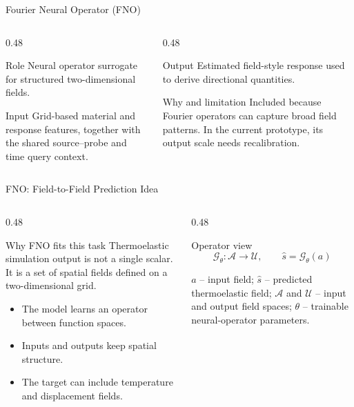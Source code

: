 \documentclass[aspectratio=169,10pt]{beamer}
\begin{document}
\begin{frame}{Fourier Neural Operator (FNO)}
  \begin{columns}[T]
    \begin{column}{0.48\textwidth}
      \begin{block}{Role}
        Neural operator surrogate for structured two-dimensional fields.
      \end{block}
      \begin{block}{Input}
        \footnotesize
        Grid-based material and response features, together with the shared
        source--probe and time query context.
      \end{block}
    \end{column}
    \begin{column}{0.48\textwidth}
      \begin{block}{Output}
        \footnotesize
        Estimated field-style response used to derive directional quantities.
      \end{block}
      \begin{block}{Why and limitation}
        \footnotesize
        Included because Fourier operators can capture broad field patterns.
        In the current prototype, its output scale needs recalibration.
      \end{block}
    \end{column}
  \end{columns}
\end{frame}

\begin{frame}{FNO: Field-to-Field Prediction Idea}
  \begin{columns}[T]
    \begin{column}{0.48\textwidth}
      \begin{block}{Why FNO fits this task}
        \footnotesize
        Thermoelastic simulation output is not a single scalar. It is a set
        of spatial fields defined on a two-dimensional grid.
      \end{block}
      \begin{itemize}
        \footnotesize
        \item The model learns an operator between function spaces.
        \item Inputs and outputs keep spatial structure.
        \item The target can include temperature and displacement fields.
      \end{itemize}
    \end{column}
    \begin{column}{0.48\textwidth}
      \begin{block}{Operator view}
        \[
          \mathcal{G}_{\theta}:\mathcal{A}\rightarrow\mathcal{U},
          \qquad
          \hat{s}=\mathcal{G}_{\theta}(a)
        \]
      \end{block}
      \scriptsize
      $a$ -- input field; $\hat{s}$ -- predicted thermoelastic field;
      $\mathcal{A}$ and $\mathcal{U}$ -- input and output field spaces;
      $\theta$ -- trainable neural-operator parameters.
    \end{column}
  \end{columns}
\end{frame}
\end{document}
